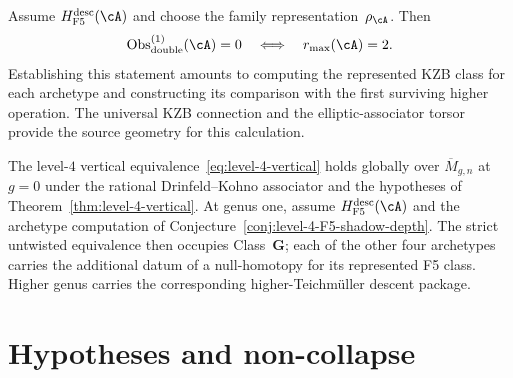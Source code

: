 \begin{conjecture}
\label{conj:level-4-F5-shadow-depth}
\ClaimStatusConjectured
Assume $H_{\mathrm{F5}}^{\mathrm{desc}}(\cA)$ and choose the
family representation~$\rho_\cA$.  Then
\[
 \operatorname{Obs}^{(1)}_{\mathrm{double}}(\cA)=0
 \quad\Longleftrightarrow\quad
 \rmax(\cA)=2.
\]
Establishing this statement amounts to computing the represented KZB
class for each archetype and constructing its comparison with the
first surviving higher operation.  The universal KZB connection and
the elliptic-associator torsor provide the source geometry for this
calculation.
\end{conjecture}

\begin{corollary}
\label{cor:level-4-stratification}
\ClaimStatusConditional
The level-$4$ vertical
equivalence~\eqref{eq:level-4-vertical} holds globally over
$\overline{M}_{g,n}$ at $g=0$ under the rational Drinfeld--Kohno
associator and the hypotheses of Theorem~\ref{thm:level-4-vertical}.
At genus one, assume $H_{\mathrm{F5}}^{\mathrm{desc}}(\cA)$ and the
archetype computation of
Conjecture~\ref{conj:level-4-F5-shadow-depth}.  The strict untwisted
equivalence then occupies Class~$\mathbf G$; each of the other four
archetypes carries the additional datum of a null-homotopy for its
represented F5 class.  Higher genus carries the corresponding
higher-Teichm\"uller descent package.
\end{corollary}

\section{Hypotheses and non-collapse}
\label{sec:level-4-hypothesis-heal}

